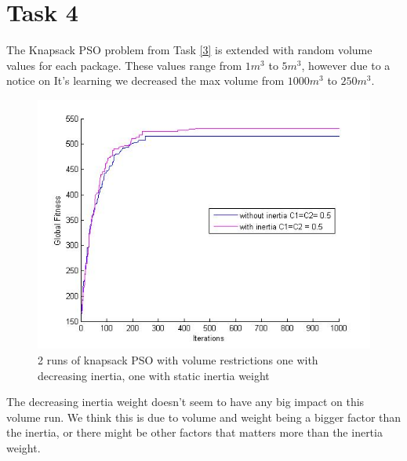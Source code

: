 \documentclass[12pt, a4paper]{article}
\begin{document}
\section{Task 4}
The Knapsack PSO problem from Task \ref{3} is extended with random volume values for each package. These values range from $1m^3$ to $5m^3$, however due to a notice on It's learning we decreased the max volume from $1000m^3$ to $250m^3$.
\begin{figure}[H]
\begin{center}
\includegraphics[width=\linewidth]{KnapSack_Volume}
\caption{2 runs of knapsack PSO with volume restrictions one with decreasing inertia, one with static inertia weight}
\end{center}
\end{figure}
The decreasing inertia weight doesn't seem to have any big impact on this volume run. We think this is due to volume and weight being a bigger factor than the inertia, or there might be other factors that matters more than the inertia weight.
\end{document}
